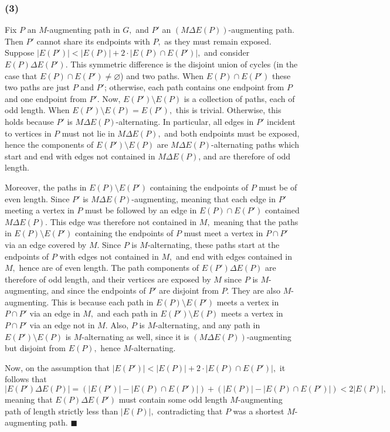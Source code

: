 \documentclass{article}
\let\emptyset\varnothing
\begin{document}
  \subsubsection*{(3)} Fix $P$ an $M$-augmenting path in $G,$ and $P'$ an $(M\Delta E(P))$-augmenting path. Then $P'$ cannot share its endpoints with $P,$ as they must remain exposed. Suppose $|E(P')|<|E(P)|+2\cdot |E(P)\cap E(P')|,$ and consider $E(P)\Delta E(P')$. This symmetric difference is the disjoint union of cycles (in the case that $E(P)\cap E(P')\neq \emptyset$) and two paths. When $E(P)\cap E(P')$ these two paths are just $P$ and $P'$; otherwise, each path contains one endpoint from $P$ and one endpoint from $P'.$ Now, $E(P') \setminus E(P)$ is a collection of paths, each of odd length. When $E(P')\setminus E(P)=E(P'),$ this is trivial. Otherwise, this holds because $P'$ is $M\Delta E(P)$-alternating. In particular, all edges in $P'$ incident to vertices in $P$ must not lie in $M\Delta E(P),$ and both endpoints must be exposed, hence the components of $E(P')\setminus E(P)$ are $M\Delta E(P)$-alternating paths which start and end with edges not contained in $M\Delta E(P)$, and are therefore of odd length.

  Moreover, the paths in $E(P)\setminus E(P')$ containing the endpoints of $P$ must be of even length. Since $P'$ is $M\Delta E(P)$-augmenting, meaning that each edge in $P'$ meeting a vertex in $P$ must be followed by an edge in $E(P)\cap E(P')$ contained $M\Delta E(P)$. This edge was therefore not contained in $M,$ meaning that the paths in $E(P)\setminus E(P')$ containing the endpoints of $P$ must meet a vertex in $P\cap P'$ via an edge covered by $M.$ Since $P$ is $M$-alternating, these paths start at the endpoints of $P$ with edges not contained in $M,$ and end with edges contained in $M,$ hence are of even length. The path components of $E(P')\Delta E(P)$ are therefore of odd length, and their vertices are exposed by $M$ since $P$ is $M$-augmenting, and since the endpoints of $P'$ are disjoint from $P$. They are also $M$-augmenting. This is because each path in $E(P)\setminus E(P')$ meets a vertex in $P\cap P'$ via an edge in $M,$ and each path in $E(P')\setminus E(P)$ meets a vertex in $P\cap P'$ via an edge not in $M.$ Also, $P$ is $M$-alternating, and any path in $E(P')\setminus E(P)$ is $M$-alternating as well, since it is $(M\Delta E(P))$-augmenting but disjoint from $E(P),$ hence $M$-alternating.

  Now, on the assumption that $|E(P')|<|E(P)|+2\cdot |E(P)\cap E(P')|,$ it follows that
  $$|E(P')\Delta E(P)|=(|E(P')|-|E(P)\cap E(P')|)+(|E(P)|-|E(P)\cap E(P')|)<2|E(P)|,$$meaning that $E(P)\Delta E(P')$ must contain some odd length $M$-augmenting path of length strictly less than $|E(P)|,$ contradicting that $P$ was a shortest $M$-augmenting path. $\blacksquare$
\end{document}
